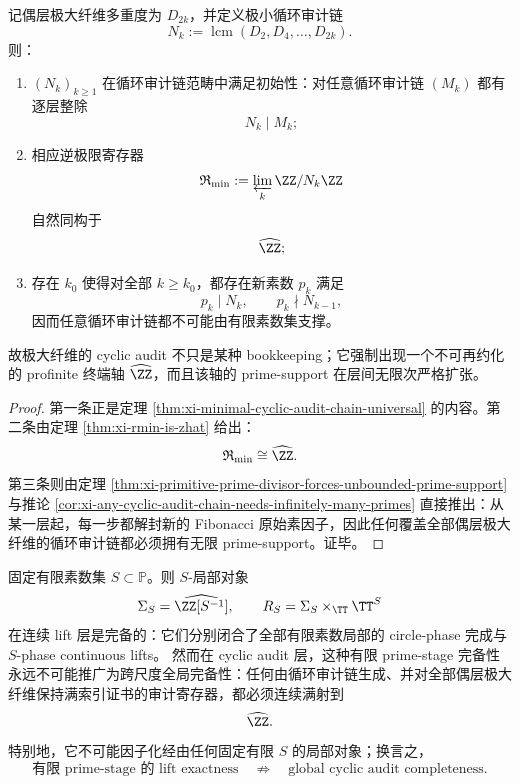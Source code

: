 \begin{theorem}\label{thm:derived-minimal-cyclic-audit-axis-zhat-prime-unlocking}
记偶层极大纤维多重度为 \(D_{2k}\)，并定义极小循环审计链
\[
N_k:=\operatorname{lcm}(D_2,D_4,\dots,D_{2k}).
\]
则：
\begin{enumerate}
\normalfont
  \item \((N_k)_{k\ge1}\) 在循环审计链范畴中满足初始性：对任意循环审计链 \((M_k)\) 都有逐层整除
  \[
  N_k\mid M_k;
  \]
  \item 相应逆极限寄存器
  \[
  \mathfrak R_{\min}:=\varprojlim_k \ZZ/N_k\ZZ
  \]
  自然同构于
  \[
  \widehat{\ZZ};
  \]
  \item 存在 \(k_0\) 使得对全部 \(k\ge k_0\)，都存在新素数 \(p_k\) 满足
  \[
  p_k\mid N_k,
  \qquad
  p_k\nmid N_{k-1},
  \]
  因而任意循环审计链都不可能由有限素数集支撑。
\end{enumerate}
故极大纤维的 cyclic audit 不只是某种 bookkeeping；它强制出现一个不可再约化的 profinite 终端轴 \(\widehat{\ZZ}\)，而且该轴的 prime-support 在层间无限次严格扩张。
\end{theorem}

\begin{proof}
第一条正是定理 \ref{thm:xi-minimal-cyclic-audit-chain-universal} 的内容。第二条由定理 \ref{thm:xi-rmin-is-zhat} 给出：
\[
\mathfrak R_{\min}\cong \widehat{\ZZ}.
\]
第三条则由定理 \ref{thm:xi-primitive-prime-divisor-forces-unbounded-prime-support} 与推论 \ref{cor:xi-any-cyclic-audit-chain-needs-infinitely-many-primes} 直接推出：从某一层起，每一步都解封新的 Fibonacci 原始素因子，因此任何覆盖全部偶层极大纤维的循环审计链都必须拥有无限 prime-support。证毕。
\end{proof}

\begin{theorem}\label{thm:derived-finite-prime-lift-exactness-vs-global-cyclic-audit-incompatibility}
固定有限素数集 \(S\subset\mathbb P\)。则 \(S\)-局部对象
\[
\Sigma_S=\widehat{\ZZ[S^{-1}]},
\qquad
R_S=\Sigma_S\times_{\TT}\TT^S
\]
在连续 lift 层是完备的：它们分别闭合了全部有限素数局部的 circle-phase 完成与 \(S\)-phase continuous lifts。
然而在 cyclic audit 层，这种有限 prime-stage 完备性永远不可能推广为跨尺度全局完备性：任何由循环审计链生成、并对全部偶层极大纤维保持满索引证书的审计寄存器，都必须连续满射到
\[
\widehat{\ZZ}.
\]
特别地，它不可能因子化经由任何固定有限 \(S\) 的局部对象；换言之，
\[
\text{有限 prime-stage 的 lift exactness}
\quad\not\Rightarrow\quad
\text{global cyclic audit completeness}.
\]
\end{theorem}


